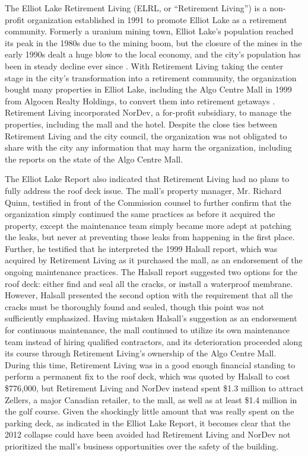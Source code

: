 \documentclass[12pt]{article}
\begin{document}
The Elliot Lake Retirement Living (ELRL, or ``Retirement Living'') is a non-profit organization established in 1991 to promote Elliot Lake as a retirement community. Formerly a uranium mining town, Elliot Lake's population reached its peak in the 1980s due to the mining boom, but the closure of the mines in the early 1990s dealt a huge blow to the local economy, and the city's population has been in steady decline ever since \cite{ElliotLakePopulation}. With Retirement Living taking the center stage in the city's transformation into a retirement community, the organization bought many properties in Elliot Lake, including the Algo Centre Mall in 1999 from Algocen Realty Holdings, to convert them into retirement getaways \cite{NYT1996}. Retirement Living incorporated NorDev, a for-profit subsidiary, to manage the properties, including the mall and the hotel. Despite the close ties between Retirement Living and the city council, the organization was not obligated to share with the city any information that may harm the organization, including the reports on the state of the Algo Centre Mall. 

The Elliot Lake Report also indicated that Retirement Living had no plans to fully address the roof deck issue. The mall's property manager, Mr. Richard Quinn, testified in front of the Commission counsel to further confirm that the organization simply continued the same practices as before it acquired the property, except the maintenance team simply became more adept at patching the leaks, but never at preventing those leaks from happening in the first place. Further, he testified that he interpreted the 1999 Halsall report, which was acquired by Retirement Living as it purchased the mall, as an endorsement of the ongoing maintenance practices. The Halsall report suggested two options for the roof deck: either find and seal all the cracks, or install a waterproof membrane. However, Halsall presented the second option with the requirement that all the cracks must be thoroughly found and sealed, though this point was not sufficiently emphasized. Having mistaken Halsall's suggestion as an endorsement for continuous maintenance, the mall continued to utilize its own maintenance team instead of hiring qualified contractors, and its deterioration proceeded along its course through Retirement Living's ownership of the Algo Centre Mall. During this time, Retirement Living was in a good enough financial standing to perform a permanent fix to the roof deck, which was quoted by Halsall to cost \$776,000, but Retirement Living and NorDev instead spent \$1.3 million to attract Zellers, a major Canadian retailer, to the mall, as well as at least \$1.4 million in the golf course. Given the shockingly little amount that was really spent on the parking deck, as indicated in the Elliot Lake Report, it becomes clear that the 2012 collapse could have been avoided had Retirement Living and NorDev not prioritized the mall's business opportunities over the safety of the building.
\end{document}
